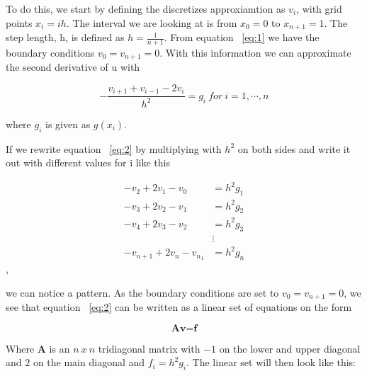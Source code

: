 \documentclass[a4paper,norsk,12pt,oneside]{article}
\begin{document}
To do this, we start by defining the discretizes approxiamtion as \(v_i\), with grid points 
\(x_i = ih\). The interval we are looking at is from \(x_0 = 0\) to \(x_{n+1} = 1\). 
The step length, h, is defined as \(h = \frac{1}{n+1}\). From equation ~\ref{eq:1}
we have the boundary conditions \(v_0 = v_{n+1} = 0\). 
With this information we can approximate the second derivative of u with

\begin{equation}\label{eq:2}
    -\frac{v_{i+1} + v_{i-1} - 2v_i}{h^2} = g_i \ for \ i = 1, \cdots, n
\end{equation}

where \(g_i\) is given as \(g(x_i)\).

If we rewrite equation ~\ref{eq:2} by multiplying with \(h^2\) on both sides
and write it out with different values for i like this

\begin{align*}
    -v_2 + 2v_1 - v_0 &= h^2g_1\\
    -v_3 + 2v_2 - v_1 &= h^2g_2\\
    -v_4 + 2v_3 - v_2 &= h^2g_3\\
    &\vdots \\
    -v_{n+1} + 2v_n - v_{n_1} &= h^2g_{n}
\end{align*}, 

we can notice a pattern. As the boundary conditions are set to \(v_0 = v_{n+1} = 0\), we see that
equation ~\ref{eq:2} can be written as a linear set of equations on the form

\begin{equation*}
    \textbf{A} \textbf{v} = \textbf{f}
\end{equation*} 

Where \(\textbf{A}\) is an \(n \ x \ n\) tridiagonal matrix with \(-1\) on the lower and 
upper diagonal and \(2\) on the main diagonal and \(f_i = h^2 g_i\). The linear set will
then look like this:
\end{document}
